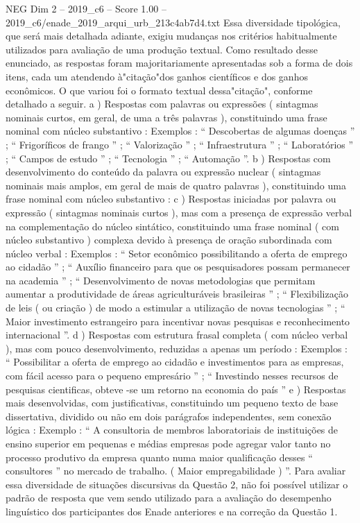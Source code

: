 \begin{textsample}{NEG Dim 2 – 2019\_c6 – Score 1.00 – 2019\_c6/enade\_2019\_arqui\_urb\_213c4ab7d4.txt}
Essa diversidade tipológica, que será mais detalhada adiante, exigiu mudanças nos critérios habitualmente utilizados para avaliação de uma produção textual.
Como resultado desse enunciado, as respostas foram majoritariamente apresentadas sob a forma de dois itens, cada um atendendo à"citação"dos ganhos científicos e dos ganhos econômicos.
O que variou foi o formato textual dessa"citação", conforme detalhado a seguir. a ) Respostas com palavras ou expressões ( sintagmas nominais curtos, em geral, de uma a três palavras ), constituindo uma frase nominal com núcleo substantivo : Exemplos : “ Descobertas de algumas doenças ” ; “ Frigoríficos de frango ” ; “ Valorização ” ; “ Infraestrutura ” ; “ Laboratórios ” ; “ Campos de estudo ” ; “ Tecnologia ” ; “ Automação ”. b ) Respostas com desenvolvimento do conteúdo da palavra ou expressão nuclear ( sintagmas nominais mais amplos, em geral de mais de quatro palavras ), constituindo uma frase nominal com núcleo substantivo : c ) Respostas iniciadas por palavra ou expressão ( sintagmas nominais curtos ), mas com a presença de expressão verbal na complementação do núcleo sintático, constituindo uma frase nominal ( com núcleo substantivo ) complexa devido à presença de oração subordinada com núcleo verbal : Exemplos : “ Setor econômico possibilitando a oferta de emprego ao cidadão ” ; “ Auxílio financeiro para que os pesquisadores possam permanecer na academia ” ; “ Desenvolvimento de novas metodologias que permitam aumentar a produtividade de áreas agriculturáveis brasileiras ” ; “ Flexibilização de leis ( ou criação ) de modo a estimular a utilização de novas tecnologias ” ; “ Maior investimento estrangeiro para incentivar novas pesquisas e reconhecimento internacional ”. d ) Respostas com estrutura frasal completa ( com núcleo verbal ), mas com pouco desenvolvimento, reduzidas a apenas um período : Exemplos : “ Possibilitar a oferta de emprego ao cidadão e investimentos para as empresas, com fácil acesso para o pequeno empresário ” ; “ Investindo nesses recursos de pesquisas cientificas, obteve -se um retorno na economia do país ” e ) Respostas mais desenvolvidas, com justificativas, constituindo um pequeno texto de base dissertativa, dividido ou não em dois parágrafos independentes, sem conexão lógica : Exemplo : “ A consultoria de membros laboratoriais de instituições de ensino superior em pequenas e médias empresas pode agregar valor tanto no processo produtivo da empresa quanto numa maior qualificação desses “ consultores ” no mercado de trabalho. ( Maior empregabilidade ) ”.
Para avaliar essa diversidade de situações discursivas da Questão 2, não foi possível utilizar o padrão de resposta que vem sendo utilizado para a avaliação do desempenho linguístico dos participantes dos Enade anteriores e na correção da Questão 1.

\end{textsample}
